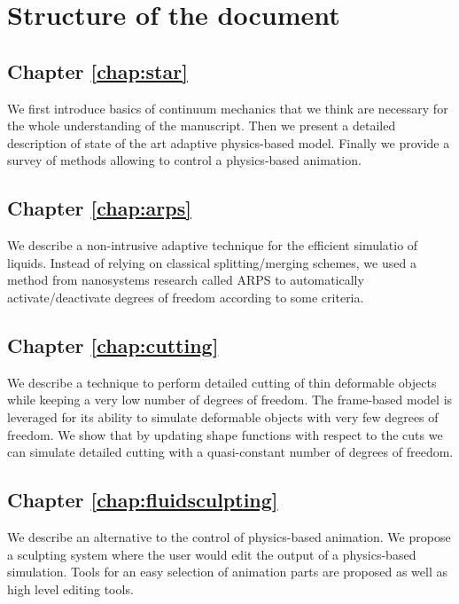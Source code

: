 \section{Structure of the document}

\subsection*{Chapter \ref{chap:star}}
We first introduce basics of continuum mechanics that we think are necessary for the whole understanding of the manuscript. Then we present a detailed description of state of the art adaptive physics-based model. Finally we provide a survey of methods allowing to control a physics-based animation. \\

\subsection*{Chapter \ref{chap:arps}}
We describe a non-intrusive adaptive technique for the efficient simulatio of liquids. Instead of relying on classical splitting/merging schemes, we used a method from nanosystems research called ARPS to automatically activate/deactivate degrees of freedom according to some criteria. \\

\subsection*{Chapter \ref{chap:cutting}}
We describe a technique to perform detailed cutting of thin deformable objects while keeping a very low number of degrees of freedom. The frame-based model is leveraged for its ability to simulate deformable objects with very few degrees of freedom. We show that by updating shape functions with respect to the cuts we can simulate detailed cutting with a quasi-constant number of degrees of freedom. \\

\subsection*{Chapter \ref{chap:fluidsculpting}}
We describe an alternative to the control of physics-based animation. We propose a sculpting system where the user would edit the output of a physics-based simulation. Tools for an easy selection of animation parts are proposed as well as high level editing tools. \\

